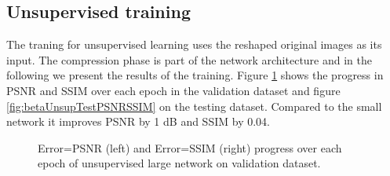 \FloatBarrier

\subsection{Unsupervised training}
The traning for unsupervised learning uses the reshaped original images as its input. The compression phase is part of the network architecture and in the following we present the results of the training. Figure \ref{fig:betaUnsupValidPSNRSSIM} shows the progress in PSNR and SSIM over each epoch in the validation dataset and figure \ref{fig:betaUnsupTestPSNRSSIM} on the testing dataset. Compared to the small network it improves PSNR by 1 dB and SSIM by 0.04.     





\begin{figure}[!htb] 
\centering 
{} 
\caption[PSNR and SSIM validation progress during training of unsupervised large network]{\color{red}Error=PSNR \color{black}(left) and \color{red}Error=SSIM \color{black}(right) progress over each epoch of unsupervised large network on validation dataset.}
\label{fig:betaUnsupValidPSNRSSIM} 
\end{figure}

